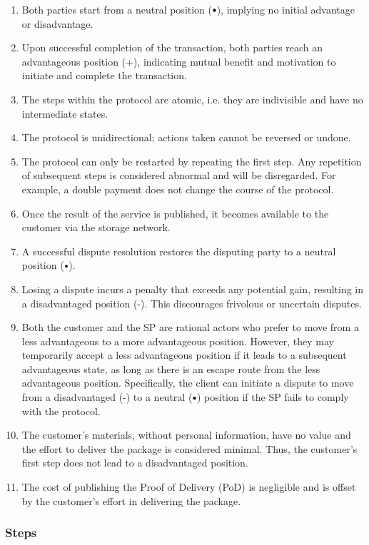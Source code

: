 \documentclass[pdftex,twocolumn,epjc3]{svjour3}
\newcommand{\plus}{+}
\newcommand{\minus}{-}
\newcommand\neutral[1][.75]{\mathbin{\ThisStyle{\vcenter{\hbox{%
  \scalebox{#1}{$\SavedStyle\bullet$}}}}}%
}
\begin{document}
\begin{enumerate}
\item Both parties start from a neutral position ($\neutral{}$), implying no initial advantage or disadvantage.
\item Upon successful completion of the transaction, both parties reach an advantageous position (\plus{}), indicating mutual benefit and motivation to initiate and complete the transaction.
\item The steps within the protocol are atomic, i.e. they are indivisible and have no intermediate states.
\item The protocol is unidirectional; actions taken cannot be reversed or undone.
\item The protocol can only be restarted by repeating the first step. Any repetition of subsequent steps is considered abnormal and will be disregarded. For example, a double payment does not change the course of the protocol.
\item Once the result of the service is published, it becomes available to the customer via the storage network.
\item A successful dispute resolution restores the disputing party to a neutral position ($\neutral{}$).
\item Losing a dispute incurs a penalty that exceeds any potential gain, resulting in a disadvantaged position (\minus{}). This discourages frivolous or uncertain disputes.
\item Both the customer and the SP are rational actors who prefer to move from a less advantageous to a more advantageous position. However, they may temporarily accept a less advantageous position if it leads to a subsequent advantageous state, as long as there is an escape route from the less advantageous position. Specifically, the client can initiate a dispute to move from a disadvantaged (\minus{}) to a neutral ($\neutral{}$) position if the SP fails to comply with the protocol.
\item The customer's materials, without personal information, have no value and the effort to deliver the package is considered minimal. Thus, the customer's first step does not lead to a disadvantaged position.
\item The cost of publishing the Proof of Delivery (PoD) is negligible and is offset by the customer's effort in delivering the package.
\end{enumerate}

\subsubsection{Steps}\label{sec:steps}
\end{document}
